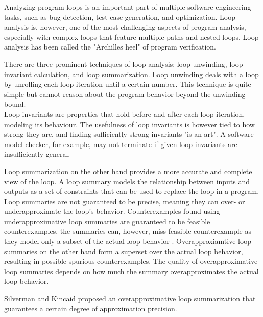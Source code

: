 
Analyzing program loops is an important part of multiple software engineering tasks, such as bug detection, test case generation, and optimization. Loop analysis is, however, one of the most challenging aspects of program analysis, especially with complex loops that feature multiple paths and nested loops. Loop analysis has been called the "Archilles heel" of program verification\cite{0.1007/s10703-012-0176-y}. \par
There are three prominent techniques of loop analysis: loop unwinding, loop invariant calculation, and loop summarization\cite{0.1007/s10703-012-0176-y, 8241837,10.1007/978-3-030-25543-5_7}. Loop unwinding deals with a loop by unrolling each loop iteration until a certain number. This technique is quite simple but cannot reason about the program behavior beyond the unwinding bound. \\
Loop invariants are properties that hold before and after each loop iteration, modeling its behaviour. The usefulness of loop invariants is however tied to how strong they are, and finding sufficiently strong invariants "is an art"\cite{0.1007/s10703-012-0176-y}. A software-model checker, for example, may not terminate if given loop invariants are insufficiently general. \par
Loop summarization on the other hand provides a more accurate and complete view of the loop. A loop summary models the relationship between inputs and outputs as a set of constraints that can be used to replace the loop in a program. Loop summaries are not guaranteed to be precise, meaning they can over- or underapproximate the loop's behavior. Counterexamples found using underapproximative loop summaries are guaranteed to be feasible counterexamples, the summaries can, however, miss feasible counterexample as they model only a subset of the actual loop behavior \cite{10.1007/s10703-015-0228-1}. Overapproxiamtive loop summaries on the other hand form a superset over the actual loop behavior, resulting in possible spurious counterexamples. The quality of overapproximative loop summaries depends on how much the summary overapproximates the actual loop behavior.\\ \par
Silverman and Kincaid\cite{10.1007/978-3-030-25543-5_7} proposed an overapproximative loop summarization that guarantees a certain degree of approximation precision.\par 
